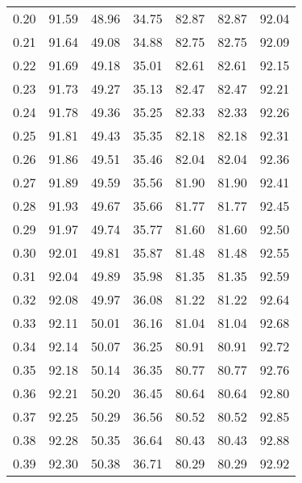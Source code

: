 \begin{tabular}{|c|c|c|c|c|c|c|}
      0.20 &     91.59 &     48.96 &      34.75 &   82.87 &      82.87 &         92.04 \\
      0.21 &     91.64 &     49.08 &      34.88 &   82.75 &      82.75 &         92.09 \\
      0.22 &     91.69 &     49.18 &      35.01 &   82.61 &      82.61 &         92.15 \\
      0.23 &     91.73 &     49.27 &      35.13 &   82.47 &      82.47 &         92.21 \\
      0.24 &     91.78 &     49.36 &      35.25 &   82.33 &      82.33 &         92.26 \\
      0.25 &     91.81 &     49.43 &      35.35 &   82.18 &      82.18 &         92.31 \\
      0.26 &     91.86 &     49.51 &      35.46 &   82.04 &      82.04 &         92.36 \\
      0.27 &     91.89 &     49.59 &      35.56 &   81.90 &      81.90 &         92.41 \\
      0.28 &     91.93 &     49.67 &      35.66 &   81.77 &      81.77 &         92.45 \\
      0.29 &     91.97 &     49.74 &      35.77 &   81.60 &      81.60 &         92.50 \\
      0.30 &     92.01 &     49.81 &      35.87 &   81.48 &      81.48 &         92.55 \\
      0.31 &     92.04 &     49.89 &      35.98 &   81.35 &      81.35 &         92.59 \\
      0.32 &     92.08 &     49.97 &      36.08 &   81.22 &      81.22 &         92.64 \\
      0.33 &     92.11 &     50.01 &      36.16 &   81.04 &      81.04 &         92.68 \\
      0.34 &     92.14 &     50.07 &      36.25 &   80.91 &      80.91 &         92.72 \\
      0.35 &     92.18 &     50.14 &      36.35 &   80.77 &      80.77 &         92.76 \\
      0.36 &     92.21 &     50.20 &      36.45 &   80.64 &      80.64 &         92.80 \\
      0.37 &     92.25 &     50.29 &      36.56 &   80.52 &      80.52 &         92.85 \\
      0.38 &     92.28 &     50.35 &      36.64 &   80.43 &      80.43 &         92.88 \\
      0.39 &     92.30 &     50.38 &      36.71 &   80.29 &      80.29 &         92.92 \\

\end{tabular}

